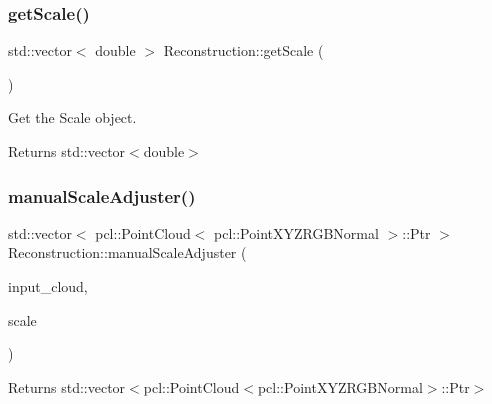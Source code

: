 \subsubsection{\texorpdfstring{get\+Scale()}{getScale()}}
{\footnotesize\ttfamily std\+::vector$<$ double $>$ Reconstruction\+::get\+Scale (\begin{DoxyParamCaption}{ }\end{DoxyParamCaption})}



Get the Scale object. 

\begin{DoxyReturn}{Returns}
std\+::vector$<$double$>$ 
\end{DoxyReturn}
\mbox{\label{classReconstruction_a6c2151dd4224cee397adb2b353e20e9b}} 
\subsubsection{\texorpdfstring{manual\+Scale\+Adjuster()}{manualScaleAdjuster()}}
{\footnotesize\ttfamily std\+::vector$<$ pcl\+::\+Point\+Cloud$<$ pcl\+::\+Point\+X\+Y\+Z\+R\+G\+B\+Normal $>$\+::Ptr $>$ Reconstruction\+::manual\+Scale\+Adjuster (\begin{DoxyParamCaption}\item[{pcl\+::\+Point\+Cloud$<$ pcl\+::\+Point\+X\+Y\+Z\+R\+G\+B\+Normal $>$\+::Ptr \&}]{input\+\_\+cloud,  }\item[{double}]{scale }\end{DoxyParamCaption})}

\begin{DoxyReturn}{Returns}
std\+::vector$<$pcl\+::\+Point\+Cloud$<$pcl\+::\+Point\+X\+Y\+Z\+R\+G\+B\+Normal$>$\+::\+Ptr$>$ 
\end{DoxyReturn}
\mbox{\label{classReconstruction_a8e8b20ec9b384b9dad21a3accfea98f2}} 
